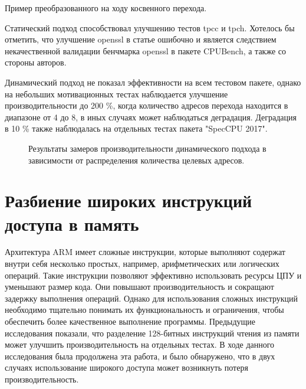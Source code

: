\begin{ListingEnv}[!h]
	\captiondelim{ } %
	\caption{Пример преобразованного на ходу косвенного перехода.}\label{indirect_algo2}
	
\end{ListingEnv} 

Статический подход способствовал улучшению тестов tpcc и tpch. Хотелось бы отметить, что улучшение openssl в статье \cite{chernonog2023статический} ошибочно и является следствием некачественной валидации бенчмарка openssl в пакете CPUBench, а также со стороны авторов.

Динамический подход не показал эффективности на всем тестовом пакете, однако на небольших мотивационных тестах  наблюдается улучшение производительности до 200 \%, когда количество адресов перехода находится в диапазоне от 4 до 8, в иных случаях может наблюдаться деградация. Деградация в 10 \% также наблюдалась на отдельных тестах пакета "SpecCPU 2017"\phantom{}.

\begin{figure}[ht]
	\caption{Результаты замеров производительности динамического подхода в зависимости от распределения количества целевых адресов.}\label{fig:ICP2}
\end{figure}


 \section {Разбиение широких инструкций доступа в память} \label{ch2:split_ldp_stp}
Архитектура ARM имеет сложные инструкции, которые выполняют содержат внутри себя несколько простых, например, арифметических или логических операций. Такие инструкции позволяют эффективно использовать ресурсы ЦПУ и уменьшают размер кода. Они повышают производительность и сокращают задержку выполнения операций. Однако для использования сложных инструкций необходимо тщательно понимать их функциональность и ограничения, чтобы обеспечить более качественное выполнение программы. Предыдущие исследования \cite{park2019microarchitecture} показали, что разделение 128-битных инструкций чтения из памяти  может улучшить производительность на отдельных тестах. В ходе данного исследования была продолжена эта работа, и было обнаружено, что в двух случаях использование широкого доступа может возникнуть потеря производительность.

